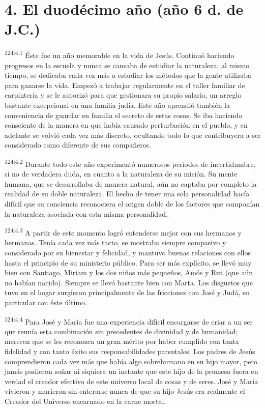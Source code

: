 \section*{4. El duodécimo año (año 6 d. de J.C.)}
\par 
\textsuperscript{124:4.1} Éste fue un año memorable en la vida de Jesús. Continuó haciendo progresos en la escuela y nunca se cansaba de estudiar la naturaleza; al mismo tiempo, se dedicaba cada vez más a estudiar los métodos que la gente utilizaba para ganarse la vida. Empezó a trabajar regularmente en el taller familiar de carpintería y se le autorizó para que gestionara su propio salario, un arreglo bastante excepcional en una familia judía. Este año aprendió también la conveniencia de guardar en familia el secreto de estas cosas. Se iba haciendo consciente de la manera en que había causado perturbación en el pueblo, y en adelante se volvió cada vez más discreto, ocultando todo lo que contribuyera a ser considerado como diferente de sus compañeros.

\par 
\textsuperscript{124:4.2} Durante todo este año experimentó numerosos períodos de incertidumbre, si no de verdadera duda, en cuanto a la naturaleza de su misión. Su mente humana, que se desarrollaba de manera natural, aún no captaba por completo la realidad de su doble naturaleza. El hecho de tener una sola personalidad hacía difícil que su conciencia reconociera el origen doble de los factores que componían la naturaleza asociada con esta misma personalidad.

\par 
\textsuperscript{124:4.3} A partir de este momento logró entenderse mejor con sus hermanos y hermanas. Tenía cada vez más tacto, se mostraba siempre compasivo y considerado por su bienestar y felicidad, y mantuvo buenas relaciones con ellos hasta el principio de su ministerio público. Para ser más explícito, se llevó muy bien con Santiago, Miriam y los dos niños más pequeños, Amós y Rut (que aún no habían nacido). Siempre se llevó bastante bien con Marta. Los disgustos que tuvo en el hogar surgieron principalmente de las fricciones con José y Judá, en particular con éste último.

\par 
\textsuperscript{124:4.4} Para José y María fue una experiencia difícil encargarse de criar a un ser que reunía esta combinación sin precedentes de divinidad y de humanidad; merecen que se les reconozca un gran mérito por haber cumplido con tanta fidelidad y con tanto éxito sus responsabilidades parentales. Los padres de Jesús comprendieron cada vez más que había algo sobrehumano en su hijo mayor, pero jamás pudieron soñar ni siquiera un instante que este hijo de la promesa fuera en verdad el creador efectivo de este universo local de cosas y de seres. José y María vivieron y murieron sin enterarse nunca de que su hijo Jesús era realmente el Creador del Universo encarnado en la carne mortal.

